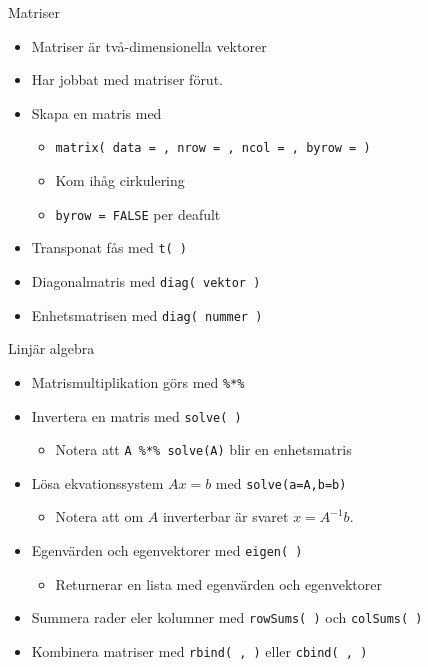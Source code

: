 \documentclass[
  11pt,
  ignorenonframetext,
  handout]{beamer}
\providecommand{\tightlist}{%
  \setlength{\itemsep}{0pt}\setlength{\parskip}{0pt}}
\begin{document}
\begin{frame}{Matriser}
\protect{}\label{matriser}
\begin{itemize}
\tightlist
\item
  Matriser är två-dimensionella vektorer
\item
  Har jobbat med matriser förut.
\item
  Skapa en matris med

  \begin{itemize}
  \tightlist
  \item
    \texttt{matrix( data = , nrow = , ncol = , byrow = )}
  \item
    Kom ihåg cirkulering
  \item
    \texttt{byrow = FALSE} per deafult
  \end{itemize}
\item
  Transponat fås med \texttt{t( )}
\item
  Diagonalmatris med \texttt{diag( vektor )}
\item
  Enhetsmatrisen med \texttt{diag( nummer )}
\end{itemize}
\end{frame}

\begin{frame}{Linjär algebra}
\protect{}\label{linjuxe4r-algebra-1}
\begin{itemize}
\tightlist
\item
  Matrismultiplikation görs med \texttt{\%*\%}
\item
  Invertera en matris med \texttt{solve( )}

  \begin{itemize}
  \tightlist
  \item
    Notera att \texttt{A \%*\% solve(A)} blir en enhetsmatris
  \end{itemize}
\item
  Lösa ekvationssystem \(Ax = b\) med \texttt{solve(a=A,b=b)}

  \begin{itemize}
  \tightlist
  \item
    Notera att om \(A\) inverterbar är svaret \(x = A^{-1}b\).
  \end{itemize}
\item
  Egenvärden och egenvektorer med \texttt{eigen( )}

  \begin{itemize}
  \tightlist
  \item
    Returnerar en lista med egenvärden och egenvektorer
  \end{itemize}
\item
  Summera rader eler kolumner med \texttt{rowSums( )} och
  \texttt{colSums( )}
\item
  Kombinera matriser med \texttt{rbind( , )} eller \texttt{cbind( , )}
\end{itemize}
\end{frame}
\end{document}
